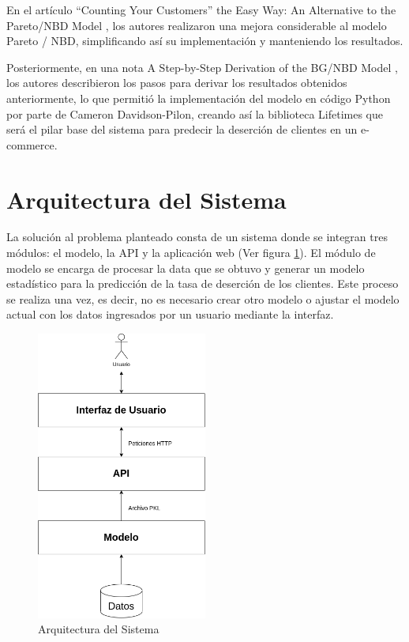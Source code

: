 	En el artículo “Counting Your Customers” the Easy Way: An Alternative to the Pareto/NBD Model \cite{fader2005}, los autores realizaron una mejora considerable al modelo Pareto / NBD, simplificando así su implementación y manteniendo los resultados.

	Posteriormente, en una nota A Step-by-Step Derivation of the BG/NBD Model \cite{fader2019}, los autores describieron los pasos para derivar los resultados obtenidos anteriormente, lo que permitió la implementación del modelo en código Python por parte de Cameron Davidson-Pilon, creando así la biblioteca Lifetimes que será el pilar base del sistema para predecir la deserción de clientes en un e-commerce.

\section{Arquitectura del Sistema}

La solución al problema planteado consta de un sistema donde se integran tres módulos: el modelo, la API y la aplicación web (Ver figura \ref{fig:arq}). El módulo de modelo se encarga de procesar la data que se obtuvo y generar un modelo estadístico para la predicción de la tasa de deserción de los clientes. Este proceso se realiza una vez, es decir, no es necesario crear otro modelo o ajustar el modelo actual con los datos ingresados por un usuario mediante la interfaz.

\begin{figure}[H]
	\centering \includegraphics[width=0.50\textwidth]{images/arquitectura-proyecto-de-grado.png}
	\caption{Arquitectura del Sistema}
	\label{fig:arq}
\end{figure}

